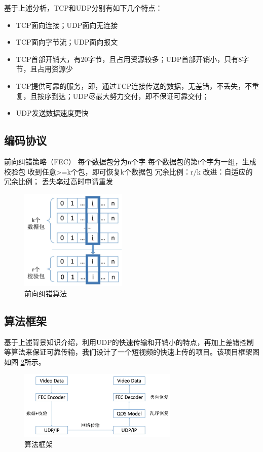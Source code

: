 \documentclass{article}
\begin{document}
\begin{CJK*}{UTF8}{gbsn}
基于上述分析，TCP和UDP分别有如下几个特点：
\begin{itemize}
\item TCP面向连接；UDP面向无连接
\item TCP面向字节流；UDP面向报文
\item TCP首部开销大，有20字节，且占用资源较多；UDP首部开销小，只有8字节，且占用资源少
\item TCP提供可靠的服务，即，通过TCP连接传送的数据，无差错，不丢失，不重复，且按序到达；UDP尽最大努力交付，即不保证可靠交付；
\item UDP发送数据速度更快
\end{itemize}

\subsection{编码协议}

前向纠错策略（FEC）
每个数据包分为n个字
每个数据包的第i个字为一组，生成校验包
收到任意>=k个包，即可恢复k个数据包
冗余比例：r/k
改进：自适应的冗余比例；
丢失率过高时申请重发
\begin{figure}[h]
	\centering
	\includegraphics[width=2in]{FEC.jpg}
	\caption{前向纠错算法}
	\label{fig:FEC}
\end{figure}

\subsection{算法框架}
基于上述背景知识介绍，利用UDP的快速传输和开销小的特点，再加上差错控制等算法来保证可靠传输，我们设计了一个短视频的快速上传的项目。该项目框架图如图 \ref{fig:frame}所示。

\begin{figure}[h]
	\centering
	\includegraphics[width=3in]{frame.jpg}
	\caption{算法框架}
	\label{fig:frame}
\end{figure}


\end{CJK*}
\end{document}

